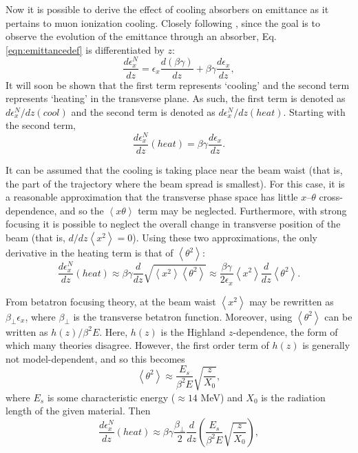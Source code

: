 \iffalse




Now it is possible to derive the effect of cooling absorbers on emittance as it pertains to muon ionization cooling. Closely following \cite{Fernow}, since the goal is to observe the evolution of the emittance through an absorber, Eq. \eqref{eqn:emittancedef} is differentiated by $z$:
%
\begin{equation}
\label{eqn:emittance1}
\frac{d\epsilon_x^N}{dz}=\epsilon_x \frac{d(\beta\gamma)}{dz}+\beta\gamma\frac{d\epsilon_x}{dz},
\end{equation}
%
It will soon be shown that the first term represents `cooling' and the second term represents `heating' in the transverse plane. As such, the first term is denoted as $d\epsilon_x^N/dz (cool)$ and the second term is denoted as $d\epsilon_x^N/dz (heat)$. Starting with the second term,
%
\begin{equation} \nonumber
\frac{d\epsilon_x^N}{dz}(heat)=\beta\gamma\frac{d\epsilon_x}{dz}.
\end{equation}
%

It can be assumed that the cooling is taking place near the beam waist (that is, the part of the trajectory where the beam spread is smallest). For this case, it is a reasonable approximation that the transverse phase space has little $x$--$\theta$ cross-dependence, and so the $\left<x\theta\right>$ term may be neglected. Furthermore, with strong focusing it is possible to neglect the overall change in transverse position of the beam \cite{Fernow} (that is, $d/dz \left<x^2\right>=0$). Using these two approximations, the only derivative in the heating term is that of $\left<\theta^2\right>$:
\begin{equation} \nonumber
\frac{d\epsilon_x^N}{dz}(heat)\approx\beta\gamma\frac{d}{dz}\sqrt{\left<x^2\right>\left<\theta^2\right>}\approx \frac{\beta\gamma}{2\epsilon_x}\left<x^2\right>\frac{d}{dz}\left<\theta^2\right>.
\end{equation}

From betatron focusing theory, at the beam waist $\left<x^2\right>$ may be rewritten as $\beta_\perp \epsilon_x$, where $\beta_\perp$ is the transverse betatron function. Moreover, using \cite{highland} $\left<\theta^2\right>$ can be written as $h(z)/\beta^2E$. Here, $h(z)$ is the Highland $z$-dependence, the form of which many theories disagree. However, the first order term of $h(z)$ is generally not model-dependent, and so this becomes
\begin{equation} \nonumber
\left<\theta^2\right>\approx\frac{E_s}{\beta^2 E}\sqrt{\frac{z}{X_0}},
\end{equation}
where $E_s$ is some characteristic energy ($\approx14$ MeV) and $X_0$ is the radiation length of the given material. Then
\begin{equation} \nonumber
\frac{d\epsilon_x^N}{dz}(heat)\approx\beta\gamma\frac{\beta_\perp}{2}\frac{d}{dz}\left(\frac{E_s}{\beta^2 E}\sqrt{\frac{z}{X_0}}\right),
\end{equation}

